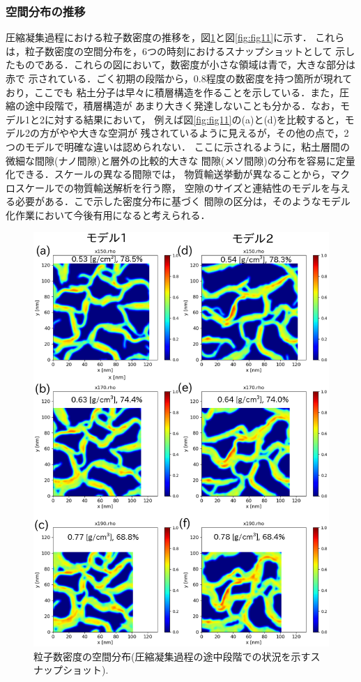 \subsubsection{空間分布の推移}
圧縮凝集過程における粒子数密度の推移を，図\ref{fig:fig10}と図\ref{fig:fig11}に示す．
これらは，粒子数密度の空間分布を，6つの時刻におけるスナップショットとして
示したものである．これらの図において，数密度が小さな領域は青で，大きな部分は赤で
示されている．ごく初期の段階から，0.8程度の数密度を持つ箇所が現れており，ここでも
粘土分子は早々に積層構造を作ることを示している．また，圧縮の途中段階で，積層構造が
あまり大きく発達しないことも分かる．なお，モデル1と2に対する結果において，
例えば図\ref{fig:fig11}の(a)と(d)を比較すると，モデル2の方がやや大きな空洞が
残されているように見えるが，その他の点で，2つのモデルで明確な違いは認められない．
ここに示されるように，粘土層間の微細な間隙(ナノ間隙)と層外の比較的大きな
間隙(メソ間隙)の分布を容易に定量化できる．スケールの異なる間隙では，
物質輸送挙動が異なることから，マクロスケールでの物質輸送解析を行う際，
空隙のサイズと連結性のモデルを与える必要がある．こで示した密度分布に基づく
間隙の区分は，そのようなモデル化作業において今後有用になると考えられる．
\begin{figure}[h]
	\begin{center}
	\includegraphics[width=1.0\linewidth]{Figs/fig10.eps} 
	\end{center}
	\caption{
		粒子数密度の空間分布(圧縮凝集過程の途中段階での状況を示すスナップショット).
	} 
	\label{fig:fig10}
\end{figure}
